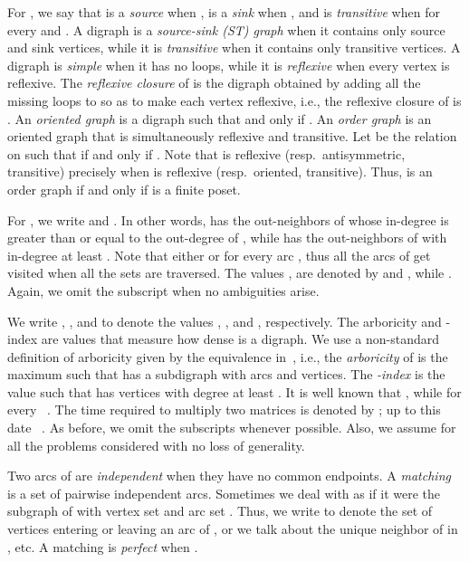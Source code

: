 \documentclass[a4paper,11pt]{article}
\begin{document}
For , we say that  is a \emph{source} when ,   is a \emph{sink} when , and  is \emph{transitive} when  for every  and .  A digraph is a \emph{source-sink (ST) graph} when it contains only source and sink vertices, while it is \emph{transitive} when it contains only transitive vertices.  A digraph is \emph{simple} when it has no loops, while it is \emph{reflexive} when every vertex is reflexive.  The \emph{reflexive closure} of  is the digraph obtained by adding all the missing loops to  so as to make each vertex reflexive, i.e., the reflexive closure of  is .  An \emph{oriented graph} is a digraph such that  and  only if .  An \emph{order graph} is an oriented graph that is simultaneously reflexive and transitive.  Let  be the relation on  such that  if and only if .  Note that  is reflexive (resp.\ antisymmetric, transitive) precisely when  is reflexive (resp.\ oriented, transitive).  Thus,  is an order graph if and only if  is a finite poset.

For , we write  and .  In other words,  has the out-neighbors of  whose in-degree is greater than or equal to the out-degree of , while  has the out-neighbors of  with in-degree at least .  Note that either  or  for every arc , thus all the arcs of  get visited when all the  sets are traversed.  The values ,  are denoted by  and , while .  Again, we omit the subscript  when no ambiguities arise.

We write , , and  to denote the values , , and , respectively.  The arboricity and -index are values that measure how dense is a digraph.  We use a non-standard definition of arboricity given by the equivalence in~\cite{Nash-WilliamsJLMS1964}, i.e., the \emph{arboricity}  of  is the maximum  such that  has a subdigraph with  arcs and  vertices.  The \emph{-index} is the value  such that  has  vertices with degree at least .  It is well known that , while  for every ~\cite{ChibaNishizekiSJC1985,LinSoulignacSzwarcfiterTCS2012}.  The time required to multiply two  matrices is denoted by ; up to this date  ~\cite{Williams2012}.  As before, we omit the subscripts  whenever possible.  Also, we assume  for all the problems considered with no loss of generality.

Two arcs of  are \emph{independent} when they have no common endpoints.  A \emph{matching} is a set  of pairwise independent arcs.  Sometimes we deal with  as if it were the subgraph of  with vertex set  and arc set .  Thus, we write  to denote the set of vertices entering or leaving an arc of , or we talk about the unique neighbor of  in , etc.  A matching is \emph{perfect} when .  
\end{document}
